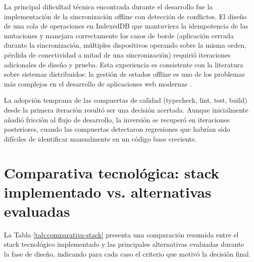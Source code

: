 La principal dificultad técnica encontrada durante el desarrollo fue la implementación de la sincronización offline con detección de conflictos. El diseño de una cola de operaciones en IndexedDB que mantuviera la idempotencia de las mutaciones y manejara correctamente los casos de borde (aplicación cerrada durante la sincronización, múltiples dispositivos operando sobre la misma orden, pérdida de conectividad a mitad de una sincronización) requirió iteraciones adicionales de diseño y prueba. Esta experiencia es consistente con la literatura sobre sistemas distribuidos: la gestión de estados offline es uno de los problemas más complejos en el desarrollo de aplicaciones web modernas \cite{richards2020}.

La adopción temprana de las compuertas de calidad (typecheck, lint, test, build) desde la primera iteración resultó ser una decisión acertada. Aunque inicialmente añadió fricción al flujo de desarrollo, la inversión se recuperó en iteraciones posteriores, cuando las compuertas detectaron regresiones que habrían sido difíciles de identificar manualmente en un código base creciente.

\section{Comparativa tecnológica: stack implementado vs. alternativas evaluadas}
\label{sec:comparativa-stack}

La Tabla \ref{tab:comparativa-stack} presenta una comparación resumida entre el stack tecnológico implementado y las principales alternativas evaluadas durante la fase de diseño, indicando para cada caso el criterio que motivó la decisión final.

